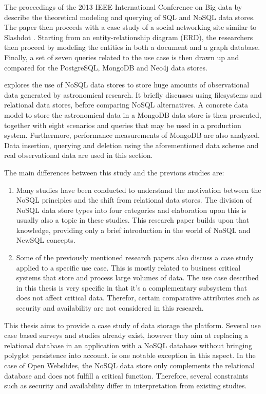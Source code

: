 The proceedings of the 2013 IEEE International Conference on Big data by \textcite{Kaur2013} describe the theoretical modeling and querying of SQL and NoSQL data stores. The paper then proceeds with a case study of a social networking site similar to Slashdot \autocite{Malda1997}. Starting from an entity-relationship diagram (ERD), the researchers then proceed by modeling the entities in both a document and a graph database. Finally, a set of seven queries related to the use case is then drawn up and compared for the PostgreSQL, MongoDB and Neo4j data stores.

\textcite{Zhao2015} explores the use of NoSQL data stores to store huge amounts of observational data generated by astronomical research. It briefly discusses using filesystems and relational data stores, before comparing NoSQL alternatives. A concrete data model to store the astronomical data in a MongoDB data store is then presented, together with eight scenarios and queries that may be used in a production system.
Furthermore, performance measurements of MongoDB are also analyzed. Data insertion, querying and deletion using the aforementioned data scheme and real observational data are used in this section.


The main differences between this study and the previous studies are:

\begin{enumerate}
  \item Many studies have been conducted to understand the motivation between the NoSQL principles and the shift from relational data stores. The division of NoSQL data store types into four categories and elaboration upon this is usually also a topic in these studies. This research paper builds upon that knowledge, providing only a brief introduction in the world of NoSQL and NewSQL concepts.
  \item Some of the previously mentioned research papers also discuss a case study applied to a specific use case. This is mostly related to business critical systems that store and process large volumes of data. The use case described in this thesis is very specific in that it's a complementary subsystem that does not affect critical data. Therefor, certain comparative attributes such as security and availability are not considered in this research.
\end{enumerate}


This thesis aims to provide a case study of data storage the \textcite{OpenWebslides2017} platform. Several use case based surveys and studies already exist, however they aim at replacing a relational database in an application with a NoSQL database without bringing polyglot persistence into account. \textcite{Sadalage2012} is one notable exception in this aspect. In the case of Open Webslides, the NoSQL data store only complements the relational database and does not fulfill a critical function. Therefore, several constraints such as security and availability differ in interpretation from existing studies.
